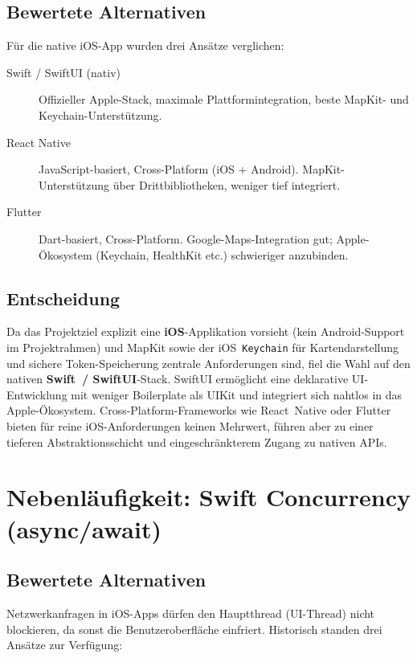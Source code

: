 \subsection{Bewertete Alternativen}
\label{subsec:ios-alternativen}

Für die native iOS-App wurden drei Ansätze verglichen:

\begin{description}
  \item[Swift / SwiftUI (nativ)] Offizieller Apple-Stack, maximale Plattformintegration,
    beste MapKit- und Keychain-Unterstützung.
  \item[React Native] JavaScript-basiert, Cross-Platform (iOS + Android). MapKit-Unterstützung
    über Drittbibliotheken, weniger tief integriert.
  \item[Flutter] Dart-basiert, Cross-Platform. Google-Maps-Integration gut; Apple-Ökosystem
    (Keychain, HealthKit etc.) schwieriger anzubinden.
\end{description}

\subsection{Entscheidung}
\label{subsec:swiftui-entscheidung}

Da das Projektziel explizit eine \textbf{iOS}-Applikation vorsieht (kein Android-Support
im Projektrahmen) und MapKit sowie der iOS~\texttt{Keychain} für Kartendarstellung
und sichere Token-Speicherung zentrale Anforderungen sind, fiel die Wahl auf den
nativen \textbf{Swift~/ SwiftUI}-Stack. SwiftUI ermöglicht eine deklarative UI-Entwicklung
mit weniger Boilerplate als UIKit und integriert sich nahtlos in das Apple-Ökosystem.
Cross-Platform-Frameworks wie React~Native oder Flutter bieten für reine iOS-Anforderungen
keinen Mehrwert, führen aber zu einer tieferen Abstraktionsschicht und eingeschränkterem
Zugang zu nativen APIs.

\section{Nebenläufigkeit: Swift Concurrency (async/await)}
\label{sec:swift-concurrency}

\subsection{Bewertete Alternativen}
\label{subsec:concurrency-alternativen}

Netzwerkanfragen in iOS-Apps dürfen den Hauptthread (UI-Thread) nicht blockieren, da
sonst die Benutzeroberfläche einfriert. Historisch standen drei Ansätze zur Verfügung:

